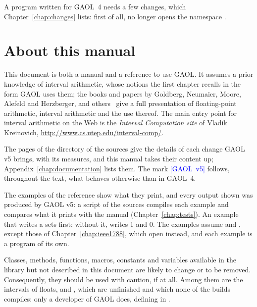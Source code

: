 \documentclass[12pt,a4paper,twoside,openright]{book}
\begin{document}
\noindent
A program written for GAOL~4 needs a few changes, which
Chapter~\ref{chap:changes} lists: first of all,  no longer
opens the namespace .

\section*{About this manual}

This document is both a manual and a reference to use GAOL. It assumes a
prior knowledge of interval arithmetic, whose notions the first chapter
recalls in the form GAOL uses them; the books and papers by Goldberg,
Neumaier, Moore, Alefeld and Herzberger, and
others~\cite{Goldberg:01,IEEE754:90,Moore:Book1966,Alefeld-Herzberger:83,Neumaier:Book1990}
give a full presentation of floating-point arithmetic, interval arithmetic
and the use thereof.
%
The main entry point for interval arithmetic on the Web is the \emph{Interval
Computation site} of Vladik Kreino\-vich,
\url{http://www.cs.utep.edu/interval-comp/}.

\medskip
The pages of the directory  of the sources give the details of each
change GAOL v5 brings, with its measures, and this manual takes their content
up; Appendix~\ref{chap:documentation} lists them. The mark
\textcolor{blue}{\textsf{\scriptsize[GAOL~v5]}} follows, throughout the
text, what behaves otherwise than in GAOL~4.

\medskip
The examples of the reference show what they print, and every output shown
was produced by GAOL v5: a script of the sources compiles each example and
compares what it prints with the manual (Chapter~\ref{chap:tests}). An
example that writes a  sets  first: without it,
 writes 1 and 0. The examples assume 
and , except those of
Chapter~\ref{chap:ieee1788}, which open  instead, and
each example is a program of its own.

\medskip
Classes, methods, functions, macros, constants and variables available in
the library but not described in this document are likely to change or to be
removed. Consequently, they should be used with caution, if at all. Among
them are the intervals of floats,  and
, which are unfinished and which none of the builds
compiles: only a developer of GAOL does, defining
 in .
%
%
\end{document}
